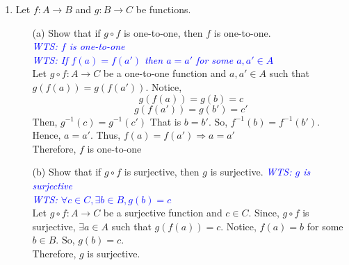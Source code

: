 \documentclass[12pt]{article}
\newcommand{\wts}[1]{\textit{\textcolor{blue}{WTS: #1}}\\}
\begin{document}
\begin{enumerate}
    \item Let $f : A \to B$ and $g : B \to C$ be functions.
    \begin{itemize}
        \item[(a)] Show that if $g \circ f$ is one-to-one, then $f$ is one-to-one.\\
        \wts{$ f $ is one-to-one}
        \wts{If $f(a)=f(a')$ then $ a=a' $ for some $ a,a'\in A $}
        Let $ g\circ f : A \to C $ be a one-to-one function and $ a,a'\in A $ such that $ g(f(a)) = g(f(a')) $. Notice,
        \[g(f(a))=g(b)=c\]
        \[g(f(a'))=g(b')=c'\]
       Then, $ g^{-1}(c) = g^{-1}(c') $ That is $ b=b' $. So, $ f^{-1}(b)=f^{-1}(b') $. Hence, $ a=a' $. Thus, $ f(a)=f(a')\Rightarrow a=a' $\\
       Therefore, $ f $ is one-to-one 
        \item[(b)] Show that if $g \circ f$ is surjective, then $g$ is surjective.
        \wts{$ g $ is surjective}
        \wts{$\forall c\in C,\exists b\in B, g(b)=c$}
        Let $ g\circ f : A\to C $ be a surjective function and $ c\in C $. Since, $ g\circ f $ is surjective, $ \exists a\in A $ such that $ g(f(a)) = c $. Notice, $ f(a)=b $ for some $ b\in B $. So, $ g(b)=c $. \\
        Therefore, $ g $ is surjective.
    \end{itemize}


\end{enumerate}
\end{document}
